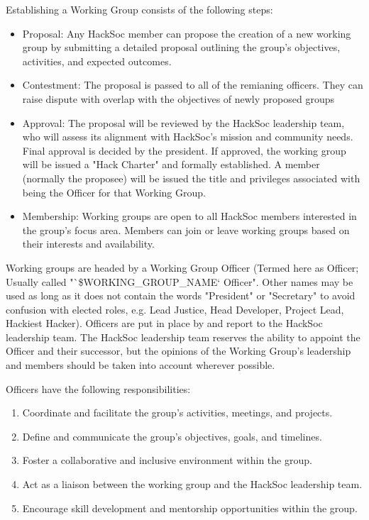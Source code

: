 \begin{clause}
    Establishing a Working Group consists of the following steps:
    \begin{itemize}
        \item Proposal: Any HackSoc member can propose the creation of a new working group by submitting a detailed proposal outlining the group's objectives, activities, and expected outcomes.
        \item Contestment: The proposal is passed to all of the remianing officers. They can raise dispute with overlap with the objectives of newly proposed groups
        \item Approval: The proposal will be reviewed by the HackSoc leadership team, who will assess its alignment with HackSoc's mission and community needs. Final approval is decided by the president. If approved, the working group will be issued a "Hack Charter" and formally established. A member (normally the proposee) will be issued the title and privileges associated with being the Officer for that Working Group.
        \item Membership: Working groups are open to all HackSoc members interested in the group's focus area. Members can join or leave working groups based on their interests and availability.
    \end{itemize}
\end{clause}

\begin{clause}
    Working groups are headed by a Working Group Officer (Termed here as Officer; Usually called "`\$WORKING_GROUP_NAME` Officer". Other names may be used as long as it does not contain the words "President" or "Secretary" to avoid confusion with elected roles, e.g. Lead Justice, Head Developer, Project Lead, Hackiest Hacker). Officers are put in place by and report to the HackSoc leadership team. The HackSoc leadership team reserves the ability to appoint the Officer and their successor, but the opinions of the Working Group's leadership and members should be taken into account wherever possible.
\end{clause}

\begin{subclause}
    Officers have the following responsibilities:
    \begin{enumerate}
        \item Coordinate and facilitate the group's activities, meetings, and projects.
        \item Define and communicate the group's objectives, goals, and timelines.
        \item Foster a collaborative and inclusive environment within the group.
        \item Act as a liaison between the working group and the HackSoc leadership team.
        \item Encourage skill development and mentorship opportunities within the group.
    \end{enumerate}
\end{subclause}

